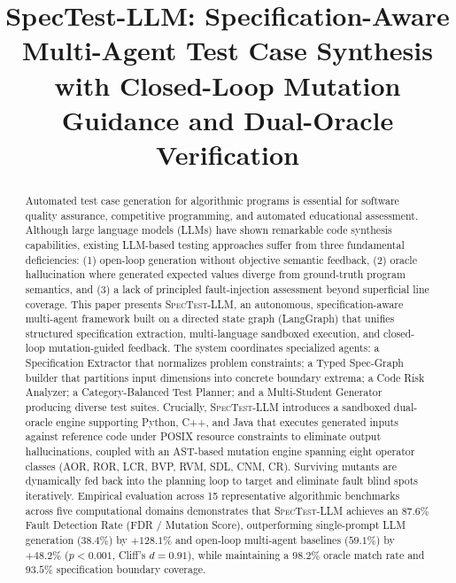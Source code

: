 \documentclass[conference]{IEEEtran}
\begin{document}
\title{SpecTest-LLM: Specification-Aware Multi-Agent Test Case Synthesis with Closed-Loop Mutation Guidance and Dual-Oracle Verification}

\author{
}

\maketitle

\begin{abstract}
Automated test case generation for algorithmic programs is essential for software quality assurance, competitive programming, and automated educational assessment. Although large language models (LLMs) have shown remarkable code synthesis capabilities, existing LLM-based testing approaches suffer from three fundamental deficiencies: (1) open-loop generation without objective semantic feedback, (2) oracle hallucination where generated expected values diverge from ground-truth program semantics, and (3) a lack of principled fault-injection assessment beyond superficial line coverage. This paper presents \textsc{SpecTest-LLM}, an autonomous, specification-aware multi-agent framework built on a directed state graph (LangGraph) that unifies structured specification extraction, multi-language sandboxed execution, and closed-loop mutation-guided feedback. The system coordinates specialized agents: a Specification Extractor that normalizes problem constraints; a Typed Spec-Graph builder that partitions input dimensions into concrete boundary extrema; a Code Risk Analyzer; a Category-Balanced Test Planner; and a Multi-Student Generator producing diverse test suites. Crucially, \textsc{SpecTest-LLM} introduces a sandboxed dual-oracle engine supporting Python, C++, and Java that executes generated inputs against reference code under POSIX resource constraints to eliminate output hallucinations, coupled with an AST-based mutation engine spanning eight operator classes (AOR, ROR, LCR, BVP, RVM, SDL, CNM, CR). Surviving mutants are dynamically fed back into the planning loop to target and eliminate fault blind spots iteratively. Empirical evaluation across 15 representative algorithmic benchmarks across five computational domains demonstrates that \textsc{SpecTest-LLM} achieves an $87.6\%$ Fault Detection Rate (FDR / Mutation Score), outperforming single-prompt LLM generation ($38.4\%$) by $+128.1\%$ and open-loop multi-agent baselines ($59.1\%$) by $+48.2\%$ ($p < 0.001$, Cliff's $d = 0.91$), while maintaining a $98.2\%$ oracle match rate and $93.5\%$ specification boundary coverage.
\end{abstract}
\end{document}
